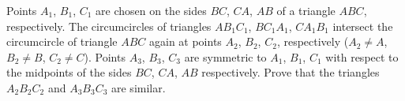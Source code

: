 Points $A_1$, $B_1$, $C_1$ are chosen on the sides $BC$, $CA$, $AB$ of a triangle $ABC$, respectively. The circumcircles of triangles $AB_1C_1$, $BC_1A_1$, $CA_1B_1$ intersect the circumcircle of triangle $ABC$ again at points $A_2$, $B_2$, $C_2$, respectively ($A_2 \neq A$, $B_2 \neq B$, $C_2 \neq C$). Points $A_3$, $B_3$, $C_3$ are symmetric to $A_1$, $B_1$, $C_1$ with respect to the midpoints of the sides $BC$, $CA$, $AB$ respectively. Prove that the triangles $A_2B_2C_2$ and $A_3B_3C_3$ are similar.
